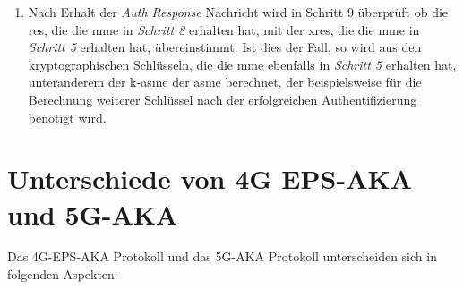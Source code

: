 \begin{enumerate}
\item Nach Erhalt der \textit{Auth Response} Nachricht wird in Schritt 9 überprüft ob die \gls{res}, die die \gls{mme} in \textit{Schritt 8} erhalten hat, mit der \gls{xres}, die die \gls{mme} in \textit{Schritt 5} erhalten hat, übereinstimmt.
Ist dies der Fall, so wird aus den kryptographischen Schlüsseln, die die \gls{mme} ebenfalls in \textit{Schritt 5} erhalten hat, unteranderem der \gls{k-asme} der \gls{asme} berechnet, der beispielsweise für die Berechnung weiterer Schlüssel nach der erfolgreichen Authentifizierung benötigt wird.%
\end{enumerate}


\section{Unterschiede von 4G EPS-AKA und 5G-AKA}

Das 4G-EPS-AKA Protokoll und das 5G-AKA Protokoll unterscheiden sich in folgenden Aspekten: %

